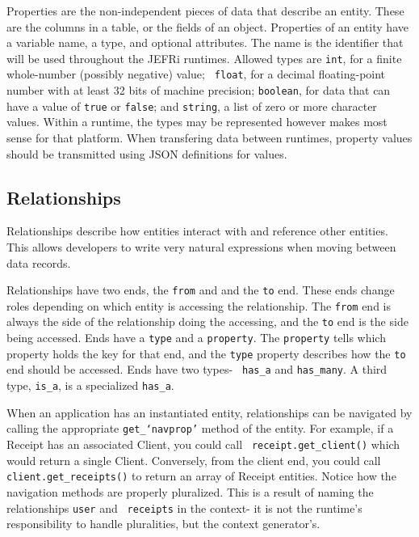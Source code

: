 \documentclass{article}
\newcommand{\ilcode}{\tt}
\begin{document}
Properties are the non-independent pieces of data that describe an entity. These
are the columns in a table, or the fields of an object. Properties of an entity
have a variable name, a type, and optional attributes. The name is the
identifier that will be used throughout the JEFRi runtimes. Allowed types are
{\ilcode int}, for a finite whole-number (possibly negative) value; {\ilcode
float}, for a decimal floating-point number with at least 32 bits of machine
precision; {\ilcode boolean}, for data that can have a value of {\ilcode true}
or {\ilcode false}; and {\ilcode string}, a list of zero or more character
values. Within a runtime, the types may be represented however makes most sense
for that platform. When transfering data between runtimes, property values
should be transmitted using JSON definitions for values.

\subsection{Relationships}

Relationships describe how entities interact with and reference other entities.
This allows developers to write very natural expressions when moving between
data records.

Relationships have two ends, the {\ilcode from} and and the {\ilcode to} end.
These ends change roles depending on which entity is accessing the relationship.
The {\ilcode from} end is always the side of the relationship doing the
accessing, and the {\ilcode to} end is the side being accessed. Ends have a
{\ilcode type} and a {\ilcode property}. The {\ilcode property} tells which
property holds the key for that end, and the {\ilcode type} property describes
how the {\ilcode to} end should be accessed. Ends have two types- {\ilcode
has\_a} and {\ilcode has\_many}. A third type, {\ilcode is\_a}, is a specialized
{\ilcode has\_a}.

When an application has an instantiated entity, relationships can be navigated
by calling the appropriate {\ilcode get\_`navprop'} method of the entity. For
example, if a Receipt has an associated Client, you could call {\ilcode
receipt.get\_client()} which would return a single Client. Conversely, from the
client end, you could call {\ilcode client.get\_receipts()} to return an array
of Receipt entities. Notice how the navigation methods are properly pluralized.
This is a result of naming the relationships {\ilcode user} and {\ilcode
receipts} in the context- it is not the runtime's responsibility to handle
pluralities, but the context generator's.
\end{document}
